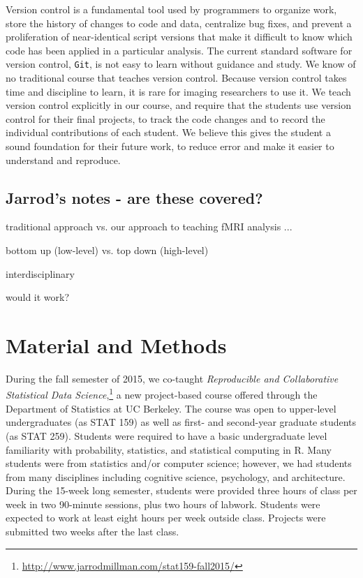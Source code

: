 Version control is a fundamental tool used by programmers to organize work,
store the history of changes to code and data, centralize bug fixes, and
prevent a proliferation of near-identical script versions that make it
difficult to know which code has been applied in a particular analysis. The
current standard software for version control, {\tt Git}, is not easy to learn
without guidance and study.  We know of no traditional course that teaches
version control.  Because version control takes time and discipline to learn,
it is rare for imaging researchers to use it.  We teach version control
explicitly in our course, and require that the students use version control
for their final projects, to track the code changes and to record the
individual contributions of each student.  We believe this gives the student a
sound foundation for their future work, to reduce error and make it easier to
understand and reproduce.

\subsection{Jarrod's notes - are these covered?}

traditional approach vs. our approach to teaching fMRI analysis ...

bottom up (low-level) vs. top down (high-level)

interdisciplinary

would it work?

\section{Material and Methods}

During the fall semester of 2015, we co-taught \emph{Reproducible and Collaborative
Statistical Data Science},\footnote{\url{http://www.jarrodmillman.com/stat159-fall2015/}}
a new project-based course offered through the Department of Statistics at UC Berkeley.
The course was open to upper-level undergraduates (as STAT 159) as well as
first- and second-year graduate students (as STAT 259).
Students were required to have a basic undergraduate level familiarity with
probability, statistics, and statistical computing in R.
Many students were from statistics and/or computer science; however, we had
students from many disciplines including cognitive science, psychology, and
architecture.
During the 15-week long semester, students were provided three hours of class
per week in two 90-minute sessions, plus two hours of labwork.
Students were expected to work at least eight hours per week outside class.
Projects were submitted two weeks after the last class.


